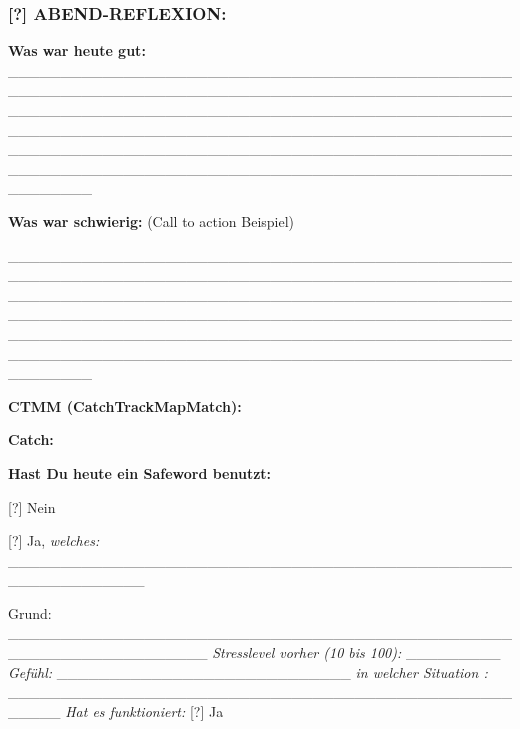 \hypertarget{abend-reflexion}{%
\subsubsection{\texorpdfstring{\textbf{[?] ABEND-REFLEXION:}}{[?] ABEND-REFLEXION:}}\label{abend-reflexion}}

\textbf{Was war heute gut:} \_\_\_\_\_\_\_\_\_\_\_\_\_\_\_\_\_\_\_\_\_\_\_\_\_\_\_\_\_\_\_\_\_\_\_\_\_\_\_\_\_\_\_\_\_\_\_\_\_\_\_\_\_\_\_\_\_\_\_\_\_\_\_\_\_\_\_\_\_\_\_\_\_\_\_\_\_\_\_\_\_\_\_\_\_\_\_\_\_\_\_\_\_\_\_\_\_\_\_\_\_\_\_\_\_\_\_\_\_\_\_\_\_\_\_\_\_\_\_\_\_\_\_\_\_\_\_\_\_\_\_\_\_\_\_\_\_\_\_\_\_\_\_\_\_\_\_\_\_\_\_\_\_\_\_\_\_\_\_\_\_\_\_\_\_\_\_\_\_\_\_\_\_\_\_\_\_\_\_\_\_\_\_\_\_\_\_\_\_\_\_\_\_\_\_\_\_\_\_\_\_\_\_\_\_\_\_\_\_\_\_\_\_\_\_\_\_\_\_\_\_\_\_\_\_\_\_\_\_\_\_\_\_\_\_\_\_\_\_\_\_\_\_\_\_\_\_\_\_\_\_\_\_\_\_\_\_\_\_\_\_\_\_\_\_\_\_\_\_\_\_\_\_\_\_\_\_\_\_\_\_\_\_\_\_\_\_\_\_\_\_\_\_\_\_\_

\textbf{Was war schwierig:} (Call to action Beispiel)

\_\_\_\_\_\_\_\_\_\_\_\_\_\_\_\_\_\_\_\_\_\_\_\_\_\_\_\_\_\_\_\_\_\_\_\_\_\_\_\_\_\_\_\_\_\_\_\_\_\_\_\_\_\_\_\_\_\_\_\_\_\_\_\_\_\_\_\_\_\_\_\_\_\_\_\_\_\_\_\_\_\_\_\_\_\_\_\_\_\_\_\_\_\_\_\_\_\_\_\_\_\_\_\_\_\_\_\_\_\_\_\_\_\_\_\_\_\_\_\_\_\_\_\_\_\_\_\_\_\_\_\_\_\_\_\_\_\_\_\_\_\_\_\_\_\_\_\_\_\_\_\_\_\_\_\_\_\_\_\_\_\_\_\_\_\_\_\_\_\_\_\_\_\_\_\_\_\_\_\_\_\_\_\_\_\_\_\_\_\_\_\_\_\_\_\_\_\_\_\_\_\_\_\_\_\_\_\_\_\_\_\_\_\_\_\_\_\_\_\_\_\_\_\_\_\_\_\_\_\_\_\_\_\_\_\_\_\_\_\_\_\_\_\_\_\_\_\_\_\_\_\_\_\_\_\_\_\_\_\_\_\_\_\_\_\_\_\_\_\_\_\_\_\_\_\_\_\_\_\_\_\_\_\_\_\_\_\_\_\_\_\_\_\_\_\_

\textbf{CTMM (CatchTrackMapMatch):}

\textbf{Catch:}

\textbf{Hast Du heute ein Safeword benutzt:}

[?] Nein

[?] Ja, \emph{welches:} \_\_\_\_\_\_\_\_\_\_\_\_\_\_\_\_\_\_\_\_\_\_\_\_\_\_\_\_\_\_\_\_\_\_\_\_\_\_\_\_\_\_\_\_\_\_\_\_\_\_\_\_\_\_\_\_\_\_\_\_\_

Grund: \_\_\_\_\_\_\_\_\_\_\_\_\_\_\_\_\_\_\_\_\_\_\_\_\_\_\_\_\_\_\_\_\_\_\_\_\_\_\_\_\_\_\_\_\_\_\_\_\_\_\_\_\_\_\_\_\_\_\_\_\_\_\_\_\_\_\_ \emph{Stresslevel vorher (10 bis 100):} \_\_\_\_\_\_\_\_\_ \emph{Gefühl:} \_\_\_\_\_\_\_\_\_\_\_\_\_\_\_\_\_\_\_\_\_\_\_\_\_\_\_\_ \emph{in welcher Situation :} \_\_\_\_\_\_\_\_\_\_\_\_\_\_\_\_\_\_\_\_\_\_\_\_\_\_\_\_\_\_\_\_\_\_\_\_\_\_\_\_\_\_\_\_\_\_\_\_\_\_\_\_\_ \emph{Hat es funktioniert:} [?] Ja

